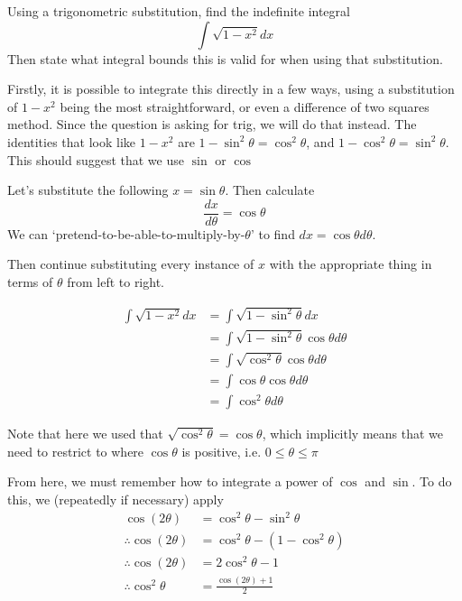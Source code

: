 \begin{example}
    Using a trigonometric substitution, find the indefinite integral 
    \[ \int \sqrt{1 - x^2} dx \] 
    Then state what integral bounds this is valid for when using that substitution.
\end{example}
\begin{solution}

    Firstly, it is possible to integrate this directly in a few ways, using a substitution of $1-x^2$ being the most straightforward, or even a difference of two squares method. Since the question is asking for trig, we will do that instead.
    The identities that look like $1-x^2$ are $1-\sin^2\theta = \cos^2 \theta$, and $1-\cos^2\theta = \sin^2 \theta$. 
    This should suggest that we use $\sin$ or $\cos$

    Let's substitute the following $x = \sin \theta$. Then calculate 
    \[ \frac{dx}{d\theta} = \cos \theta\]
    We can `pretend-to-be-able-to-multiply-by-$\theta$' to find $dx = \cos\theta d\theta$.

    Then continue substituting every instance of $x$ with the appropriate thing in terms of $\theta$ from left to right.

    \begin{align*}
        \int \sqrt{1 - x^2} dx &= \int \sqrt{1 - \sin^2 \theta} dx \tag{using $x = \sin\theta$}\\
         &=  \int \sqrt{1 - \sin^2 \theta} \cos\theta d\theta \tag{using $dx = \cos\theta d\theta$}\\ 
         &= \int \sqrt{\cos^2 \theta} \cos\theta d\theta \tag{trig identity}\\
         &= \int \cos \theta \cos \theta d\theta \\ 
         &= \int \cos^2 \theta d\theta
    \end{align*}

    Note that here we used that $\sqrt{\cos^2 \theta} = \cos \theta$, which implicitly means that we need to restrict to where $\cos \theta$ is positive, i.e. 
    $0 \leq \theta \leq \pi$

    From here, we must remember how to integrate a power of $\cos$ and $\sin$. To do this, we (repeatedly if necessary) apply 
    \begin{align*}
    \cos(2\theta) &= \cos^2 \theta - \sin^2\theta     \tag{trig identity}\\
    \therefore \cos(2\theta) &= \cos^2 \theta - (1 - \cos^2 \theta) \tag{trig identity}\\
    \therefore \cos(2 \theta) &= 2 \cos^2 \theta - 1 \tag{simplifying}\\
    \therefore \cos^2 \theta &= \frac{\cos(2 \theta) + 1}{2}   \tag{rearranging}
    \end{align*}


\end{solution}
